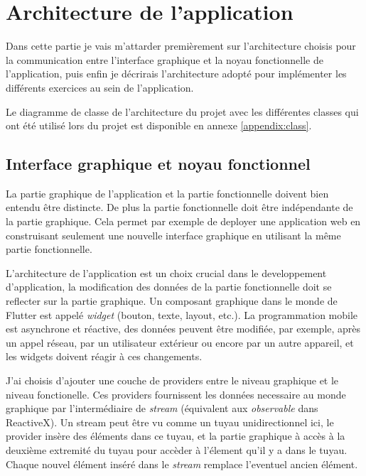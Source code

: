 \section{Architecture de l'application}

Dans cette partie je vais m'attarder premièrement sur l'architecture choisis pour la communication entre l'interface graphique et la noyau fonctionnelle de l'application, puis enfin je décrirais l'architecture adopté pour implémenter les différents exercices au sein de l'application.

Le diagramme de classe de l'architecture du projet avec les différentes classes qui ont été utilisé lors du projet est disponible en annexe \ref{appendix:class}.

\subsection{Interface graphique et noyau fonctionnel}
La partie graphique de l'application et la partie fonctionnelle doivent bien entendu être distincte. De plus la partie fonctionnelle doit être indépendante de la partie graphique. Cela permet par exemple de deployer une application web en construisant seulement une nouvelle interface graphique en utilisant la même partie fonctionnelle.

L'architecture de l'application est un choix crucial dans le developpement d'application, la modification des données de la partie fonctionnelle doit se reflecter sur la partie graphique. Un composant graphique dans le monde de Flutter est appelé \textit{widget} (bouton, texte, layout, etc.). La programmation mobile est asynchrone et réactive, des données peuvent être modifiée, par exemple, après un appel réseau, par un utilisateur extérieur ou encore par un autre appareil, et les widgets doivent réagir à ces changements.

J'ai choisis d'ajouter une couche de providers entre le niveau graphique et le niveau fonctionelle. Ces providers fournissent les données necessaire au monde graphique par l'intermédiaire de \textit{stream} (équivalent aux \textit{observable} dans ReactiveX). Un stream peut être vu comme un tuyau unidirectionnel ici, le provider insère des éléments dans ce tuyau, et la partie graphique à accès à la deuxième extremité du tuyau pour accèder à l'élement qu'il y a dans le tuyau. Chaque nouvel élément inséré dans le \textit{stream} remplace l'eventuel ancien élément.

